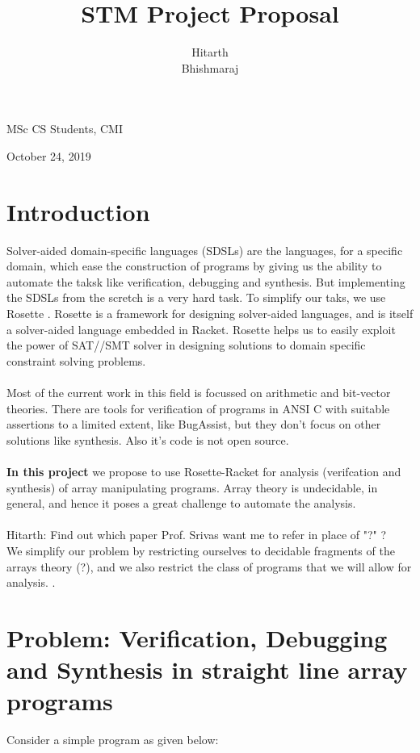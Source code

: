 \documentclass[a4paper, 12pt, notitlepage] {article}
\author{Hitarth \\ Bhishmaraj}
\title{STM Project Proposal}
\date{} %
\newcommand{\hcmt}[1]{{\color{magenta} \tiny{Hitarth: {#1}}}}
\begin{document}
\maketitle		


\begin{center}
MSc CS Students, CMI
\end{center}
\begin{center}
October 24, 2019
\end{center}
\newpage

\section{Introduction}

Solver-aided domain-specific languages (SDSLs) are the languages, for a specific domain, which ease the construction of programs by giving us the ability to automate the taksk like verification, debugging and synthesis. But implementing the SDSLs from the scretch is a very hard task. To simplify our taks, we use Rosette \cite{rosette_paper}. Rosette is a framework for designing solver-aided languages, and is itself a solver-aided language embedded in Racket. Rosette helps us to easily exploit the power of SAT//SMT solver in designing solutions to domain specific constraint solving problems.\\
\\
Most of the current work in this field is focussed on arithmetic and bit-vector theories. There are tools for verification of programs in ANSI C with suitable assertions to  a limited extent, like BugAssist\cite{bugassist}, but they don't focus on other solutions like synthesis. Also it's code is not open source.\\
 \\
{\bf In this project} we propose to use Rosette-Racket for analysis (verifcation and synthesis) of array manipulating programs. Array theory is undecidable, in general, and hence it poses a great challenge to automate the analysis.\\\\
\hcmt{Find out which paper Prof. Srivas want me to refer in place of "?" ? }\\
We simplify our problem by restricting ourselves to decidable fragments of the arrays theory (?), and we also restrict the class of programs that we will allow for analysis. .

\section {Problem: Verification, Debugging and Synthesis in straight line array programs}
Consider a simple program as given below:
\end{document}
